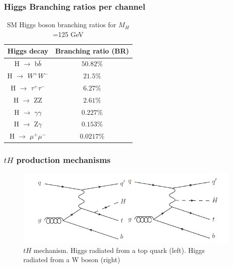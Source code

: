 \documentclass[11pt]{beamer}
\begin{document}
\begin{frame}
\frametitle{Higgs Branching ratios per channel}
\begin{table}
	\caption*{SM Higgs boson branching ratios for  $M_H$ =125 GeV}
\begin{center}
\begin{tabular}{|c|c|}
	\hline
	Higgs decay & Branching ratio (BR)\\
	\hline
	H $\rightarrow$ b$\bar{b}$ &
	$50.82\%$ \\
	\hline
	H $\rightarrow$ $W^+W^-$ &
	$21.5\%$ \\
	\hline
	H $\rightarrow$ $\tau^+ \tau^-$ &
	$6.27\%$\\
\hline
	H $\rightarrow$ ZZ &
$2.61\%$\\
\hline
	H $\rightarrow$ $\gamma\gamma$ &
$0.227\%$\\
\hline
	H $\rightarrow$ Z$\gamma$ &
$0.153\%$\\
\hline
	H $\rightarrow$ $\mu^+\mu^-$ &
$0.0217\%$\\
\hline
\end{tabular}
\end{center}
\end{table}

\end{frame}

{\nologo
\begin{frame}
\frametitle{$tH$ production mechanisms}
\begin{center}
\begin{figure} 
\includegraphics[scale=0.4]{figures/tq.png} 
\caption*{$tH$ mechanism. Higgs radiated from a top quark (left). Higgs radiated from a W boson (right)} 
\label{th}
\end{figure}
\end{center}
\end{frame} 
}
\end{document}
